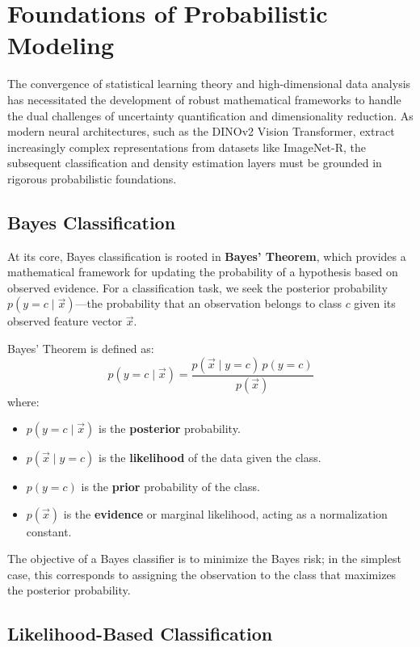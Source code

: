 \section{Foundations of Probabilistic Modeling}

The convergence of statistical learning theory and high-dimensional data analysis has necessitated the development of robust mathematical frameworks to handle the dual challenges of uncertainty quantification and dimensionality reduction. As modern neural architectures, such as the DINOv2 Vision Transformer, extract increasingly complex representations from datasets like ImageNet-R, the subsequent classification and density estimation layers must be grounded in rigorous probabilistic foundations. 

\subsection{Bayes Classification}

At its core, Bayes classification is rooted in \textbf{Bayes' Theorem}, which provides a mathematical framework for updating the probability of a hypothesis based on observed evidence. For a classification task, we seek the posterior probability $p(y=c \mid \vec{x})$—the probability that an observation belongs to class $c$ given its observed feature vector $\vec{x}$.

Bayes' Theorem is defined as:
\begin{equation}
	p(y=c \mid \vec{x}) = \frac{p(\vec{x} \mid y=c) \, p(y=c)}{p(\vec{x})}
\end{equation}
where:
\begin{itemize}
	\item $p(y=c \mid \vec{x})$ is the \textbf{posterior} probability.
	\item $p(\vec{x} \mid y=c)$ is the \textbf{likelihood} of the data given the class.
	\item $p(y=c)$ is the \textbf{prior} probability of the class.
	\item $p(\vec{x})$ is the \textbf{evidence} or marginal likelihood, acting as a normalization constant.
\end{itemize}

The objective of a Bayes classifier is to minimize the Bayes risk; in the simplest case, this corresponds to assigning the observation to the class that maximizes the posterior probability.

\subsection{Likelihood-Based Classification}

